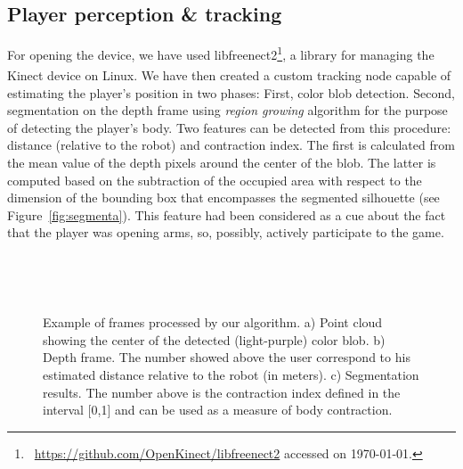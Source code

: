 \subsection{Player perception \& tracking}
For opening the device, we have used libfreenect2\footnote{~\url{https://github.com/OpenKinect/libfreenect2} accessed on \today.}, a library for managing the Kinect\textsuperscript{\textregistered} device on Linux. We have then created a custom tracking node capable of estimating the player's position in two phases: First, color blob detection. Second, segmentation on the depth frame using \textit{region growing} algorithm for the purpose of detecting the player's body. Two features can be detected from this procedure: distance (relative to the robot) and contraction index. The first is calculated from the mean value of the depth pixels around the center of the blob. The latter is computed based on the subtraction of the occupied area with respect to the dimension of the bounding box that encompasses the segmented silhouette (see Figure~\ref{fig:segmenta}). This feature had been considered as a cue about the fact that the player was opening arms, so, possibly, actively participate to the game.

\begin{figure}[h]
  \centering 
  \begin{subfigure}[b]{0.3\textwidth}
		\centering
		\caption{}
  \end{subfigure}
  ~
  \begin{subfigure}[b]{0.3\textwidth}
		\centering
		\caption{}
  \end{subfigure}
  ~
  \begin{subfigure}[b]{0.3\textwidth}
		\centering
		\caption{}
  \end{subfigure}
  \caption{Example of frames processed by our algorithm. a) Point cloud showing the center of the detected (light-purple) color blob. b) Depth frame. The number showed above the user correspond to his estimated distance relative to the robot (in meters). c) Segmentation results. The number above is the contraction index defined in the interval [0,1] and can be used as a measure of body contraction.}\label{fig:segmenta}
   \label{segmentacao}
\end{figure}